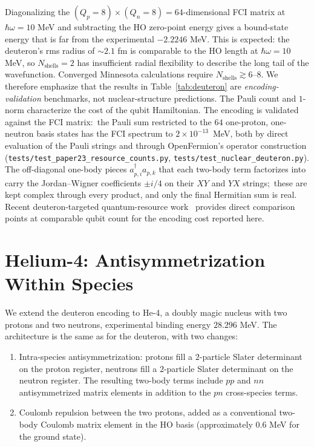 \documentclass[twocolumn,prc,amsmath,amssymb,superscriptaddress]{revtex4-2}
\begin{document}
Diagonalizing the $(Q_p = 8)\times(Q_n = 8) = 64$-dimensional FCI
matrix at $\hbar\omega = 10$ MeV and subtracting the HO zero-point
energy gives a bound-state energy that is far from the experimental
$-2.2246$ MeV. This is expected: the deuteron's rms radius of
$\sim 2.1$ fm is comparable to the HO length at $\hbar\omega = 10$
MeV, so $N_{\mathrm{shells}}=2$ has insufficient radial flexibility to
describe the long tail of the wavefunction. Converged Minnesota
calculations require $N_{\mathrm{shells}} \gtrsim 6$--$8$. We therefore
emphasize that the results in Table~\ref{tab:deuteron} are
\emph{encoding-validation} benchmarks, not nuclear-structure
predictions. The Pauli count and $1$-norm characterize the cost of
the qubit Hamiltonian. The encoding is validated against the FCI
matrix:\ the Pauli sum restricted to the $64$ one-proton, one-neutron
basis states has the FCI spectrum to $2\times 10^{-13}$~MeV, both by
direct evaluation of the Pauli strings and through OpenFermion's
operator construction
(\texttt{tests/test\_paper23\_resource\_counts.py},
\texttt{tests/test\_nuclear\_deuteron.py}). The off-diagonal one-body
pieces $a^\dagger_{p,i} a_{p,k}$ that each two-body term factorizes
into carry the Jordan--Wigner coefficients $\pm i/4$ on their $XY$ and
$YX$ strings;\ these are kept complex through every product, and only
the final Hermitian sum is real. Recent
deuteron-targeted quantum-resource
work~\cite{SarmaStevenson2025,PillaiRamanan2025} provides direct
comparison points at comparable qubit count for the encoding cost
reported here.

\section{Helium-4: Antisymmetrization Within Species}
\label{sec:he4}

We extend the deuteron encoding to He-4, a doubly magic nucleus with
two protons and two neutrons, experimental binding energy $28.296$
MeV. The architecture is the same as for the deuteron, with two
changes:

\begin{enumerate}
  \item Intra-species antisymmetrization: protons fill a $2$-particle
    Slater determinant on the proton register, neutrons fill a
    $2$-particle Slater determinant on the neutron register. The
    resulting two-body terms include $pp$ and $nn$ antisymmetrized
    matrix elements in addition to the $pn$ cross-species terms.
  \item Coulomb repulsion between the two protons, added as a
    conventional two-body Coulomb matrix element in the HO basis
    (approximately $0.6$ MeV for the ground state).
\end{enumerate}
\end{document}
